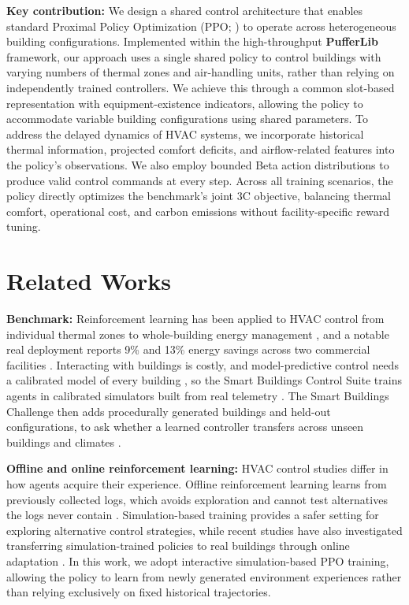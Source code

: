 \documentclass{article}
\begin{document}
\textbf{Key contribution:} We design a shared control architecture that enables standard Proximal Policy Optimization (PPO; \citep{schulman2017proximal}) to operate across heterogeneous building configurations. Implemented within the high-throughput \textbf{PufferLib} framework, our approach uses a single shared policy to control buildings with varying numbers of thermal zones and air-handling units, rather than relying on independently trained controllers. We achieve this through a common slot-based representation with equipment-existence indicators, allowing the policy to accommodate variable building configurations using shared parameters. To address the delayed dynamics of HVAC systems, we incorporate historical thermal information, projected comfort deficits, and airflow-related features into the policy's observations. We also employ bounded Beta action distributions to produce valid control commands at every step. Across all training scenarios, the policy directly optimizes the benchmark's joint 3C objective, balancing thermal comfort, operational cost, and carbon emissions without facility-specific reward tuning.

\section{Related Works}

\textbf{Benchmark:} Reinforcement learning has been applied to HVAC control from individual thermal zones to whole-building energy management \citep{wei2017deep,yu2021review}, and a notable real deployment reports 9\% and 13\% energy savings across two commercial facilities \citep{luo2022controlling}. Interacting with buildings is costly, and model-predictive control needs a calibrated model of every building \citep{afram2014theory}, so the Smart Buildings Control Suite trains agents in calibrated simulators built from real telemetry \citep{blum2019prototyping,goldfeder2024smart}. The Smart Buildings Challenge then adds procedurally generated buildings and held-out configurations, to ask whether a learned controller transfers across unseen buildings and climates \citep{goldfeder2026smart}.

\textbf{Offline and online reinforcement learning:} HVAC control studies differ in how agents acquire their experience. Offline reinforcement learning learns from previously collected logs, which avoids exploration and cannot test alternatives the logs never contain \citep{blad2022data,levine2020offline}. Simulation-based training provides a safer setting for exploring alternative control strategies, while recent studies have also investigated transferring simulation-trained policies to real buildings through online adaptation \citep{coraci2023online}. In this work, we adopt interactive simulation-based PPO training, allowing the policy to learn from newly generated environment experiences rather than relying exclusively on fixed historical trajectories.
\end{document}
